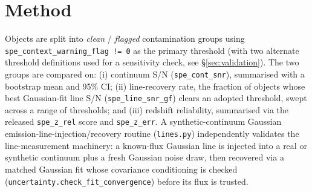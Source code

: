 \documentclass[11pt]{article}
\begin{document}
\section{Method}
Objects are split into \emph{clean} / \emph{flagged} contamination groups using
\texttt{spe\_context\_warning\_flag != 0} as the primary threshold (with two alternate threshold
definitions used for a sensitivity check, see \S\ref{sec:validation}). The two groups are compared on: (i)
continuum S/N (\texttt{spe\_cont\_snr}), summarised with a bootstrap mean and 95\% CI; (ii) line-recovery
rate, the fraction of objects whose best Gaussian-fit line S/N (\texttt{spe\_line\_snr\_gf}) clears an
adopted threshold, swept across a range of thresholds; and (iii) redshift reliability, summarised via the
released \texttt{spe\_z\_rel} score and \texttt{spe\_z\_err}. A synthetic-continuum Gaussian
emission-line-injection/recovery routine (\texttt{lines.py}) independently validates the line-measurement
machinery: a known-flux Gaussian line is injected into a real or synthetic continuum plus a fresh Gaussian
noise draw, then recovered via a matched Gaussian fit whose covariance conditioning is checked
(\texttt{uncertainty.check\_fit\_convergence}) before its flux is trusted.
\end{document}
